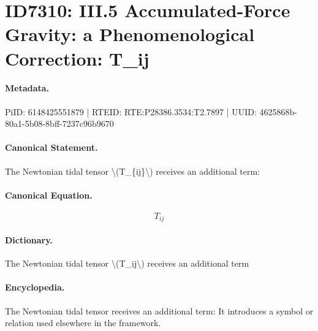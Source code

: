 \section*{ID7310: III.5 Accumulated-Force Gravity: a Phenomenological Correction: T\_ij}
\paragraph{Metadata.}
PiID: 6148425551879 | RTEID: RTE:P28386.3534:T2.7897 | UUID: 4625868b-80a1-5b08-8bff-7237c96b9670

\paragraph{Canonical Statement.}
The Newtonian tidal tensor \textbackslash{}(T\_\{ij\}\textbackslash{}) receives an additional term:

\paragraph{Canonical Equation.}
\[
T_{ij}
\]

\paragraph{Dictionary.}
The Newtonian tidal tensor \textbackslash{}(T\_ij\textbackslash{}) receives an additional term

\paragraph{Encyclopedia.}
The Newtonian tidal tensor receives an additional term: It introduces a symbol or relation used elsewhere in the framework.
